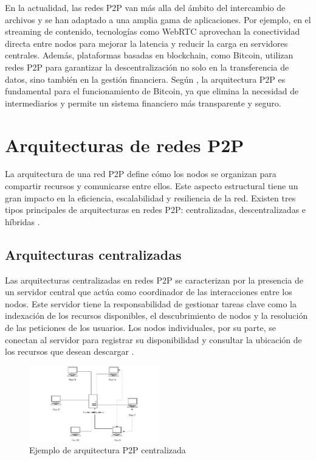 En la actualidad, las redes P2P van más alla del ámbito del intercambio de archivos y se han adaptado a una amplia gama de aplicaciones.
Por ejemplo, en el streaming de contenido, tecnologías como WebRTC aprovechan la conectividad directa entre nodos para mejorar la latencia y reducir la carga en servidores centrales.
Además, plataformas basadas en blockchain, como Bitcoin, utilizan redes P2P para garantizar la descentralización no solo en la transferencia de datos, sino también en la gestión financiera.
Según \cite{nakamoto2008}, la arquitectura P2P es fundamental para el funcionamiento de Bitcoin, ya que elimina la necesidad de intermediarios y permite un sistema financiero más transparente y seguro.

\section{Arquitecturas de redes P2P}

La arquitectura de una red P2P define cómo los nodos se organizan para compartir recursos y comunicarse entre ellos.
Este aspecto estructural tiene un gran impacto en la eficiencia, escalabilidad y resiliencia de la red.
Existen tres tipos principales de arquitecturas en redes P2P: centralizadas, descentralizadas e híbridas \cite{schollmeier2001, risson2006}.

\subsection{Arquitecturas centralizadas}

Las arquitecturas centralizadas en redes P2P se caracterizan por la presencia de un servidor central que actúa como coordinador de las interacciones entre los nodos.
Este servidor tiene la responsabilidad de gestionar tareas clave como la indexación de los recursos disponibles, el descubrimiento de nodos y la resolución de las peticiones de los usuarios.
Los nodos individuales, por su parte, se conectan al servidor para registrar su disponibilidad y consultar la ubicación de los recursos que desean descargar \cite{schollmeier2001}.

\begin{figure}[h]
    \centering
    \includegraphics[width = 0.5\textwidth]{Imagenes/Vectorial/p2p_centralized}
    \caption{Ejemplo de arquitectura P2P centralizada}
    \label{fig:p2pcentralized}
\end{figure}


